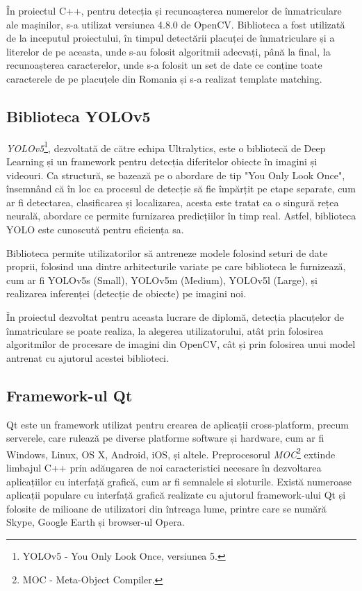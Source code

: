 \documentclass[12pt]{article}
\begin{document}
\^{I}n proiectul C++, pentru detecția și recunoașterea numerelor de \^{i}nmatriculare ale mașinilor, s-a utilizat versiunea 4.8.0 de OpenCV. Biblioteca a fost utilizat\u{a} de la inceputul proiectului, \^{i}n timpul detect\u{a}rii placuței de \^{i}nmatriculare și a literelor de pe aceasta, unde s-au folosit algoritmii adecvați, p\^{a}n\u{a} la final, la recunoașterea caracterelor, unde s-a folosit un set de date ce conține toate caracterele de pe placuțele din Romania și s-a realizat template matching.

\subsection{Biblioteca YOLOv5}

\emph{YOLOv5}\footnote{YOLOv5 - You Only Look Once, versiunea 5.}, dezvoltat\u{a} de c\u{a}tre echipa Ultralytics, este o bibliotec\u{a} de Deep Learning și un framework pentru detecția diferitelor obiecte \^{i}n imagini și videouri. Ca structur\u{a}, se bazeaz\u{a} pe o abordare de tip "You Only Look Once", \^{i}nsemn\^{a}nd c\u{a} \^{i}n loc ca procesul de detecție s\u{a} fie \^{i}mp\u{a}rțit pe etape separate, cum ar fi detectarea, clasificarea și localizarea, acesta este tratat ca o singur\u{a} rețea neural\u{a}, abordare ce permite furnizarea predicțiilor \^{i}n timp real. Astfel, biblioteca YOLO este cunoscut\u{a} pentru eficiența sa. 

Biblioteca permite utilizatorilor s\u{a} antreneze modele folosind seturi de date proprii, folosind una dintre arhitecturile variate pe care biblioteca le furnizeaz\u{a}, cum ar fi YOLOv5s (Small), YOLOv5m (Medium), YOLOv5l (Large),  și realizarea inferenței (detecție de obiecte) pe imagini noi. 

\^{I}n proiectul dezvoltat pentru aceasta lucrare de diplom\u{a}, detecția placuțelor de \^{i}nmatriculare se poate realiza, la alegerea utilizatorului, at\^{a}t prin folosirea algoritmilor de procesare de imagini din OpenCV, c\^{a}t și prin folosirea unui model antrenat cu ajutorul acestei biblioteci.

\subsection{Framework-ul Qt}
Qt este un framework utilizat pentru crearea de aplicații cross-platform, precum serverele, care ruleaz\u{a} pe diverse platforme software și hardware, cum ar fi Windows, Linux, OS X, Android, iOS, și altele. Preprocesorul \emph{MOC}\footnote{MOC - Meta-Object Compiler.} extinde limbajul C++ prin ad\u{a}ugarea de noi caracteristici necesare \^{i}n dezvoltarea aplicațiilor cu interfaț\u{a} grafic\u{a}, cum ar fi semnalele si sloturile. Exist\u{a} numeroase aplicații populare cu interfaț\u{a} grafic\u{a} realizate cu ajutorul framework-ului Qt și folosite de milioane de utilizatori din \^{i}ntreaga lume, printre care se num\u{a}r\u{a} Skype, Google Earth și browser-ul Opera.
\end{document}
